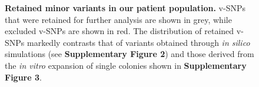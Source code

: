 \documentclass[12pt, oneside]{article}   	%
\begin{document}
\begin{figure}
\centering
{}
\label{fig:supfig4}
\caption{\textbf{Retained minor variants in our patient population.} v-SNPs that were retained for further analysis are shown in grey, while excluded v-SNPs are shown in red. The distribution of retained v-SNPs markedly contrasts that of variants obtained through \emph{in silico} simulations (see \textbf{Supplementary Figure 2}) and those derived from the \emph{in vitro} expansion of single colonies shown in \textbf{Supplementary Figure 3}.}
\end{figure}

\newpage
\end{document}
